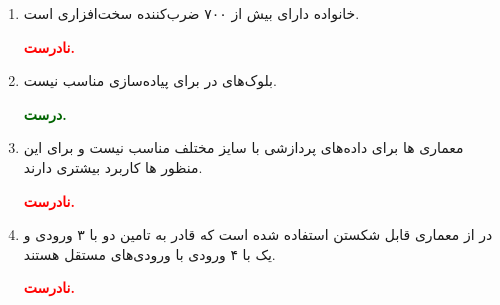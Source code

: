 \begin{enumerate}
\begin{qsolve}
	\end{qsolve}
	
	
	
	
	\item 
خانواده  دارای بیش از ۷۰۰ ضرب‌کننده سخت‌افزاری است.
	\begin{qsolve}
		\textbf{\textcolor{red}{نادرست.}}\\
	
	\end{qsolve}
	
	
	
	
	\item 
بلوک‌های  در  برای پیاده‌سازی  مناسب نیست.
	\begin{qsolve}
		\textbf{\textcolor{darkgreen}{درست.}}\\
		
	\end{qsolve}
	
	
	
	\item 
معماری ها برای داده‌های پردازشی با سایز مختلف مناسب نیست و برای این منظور ها کاربرد بیشتری دارند.

	\begin{qsolve}
		\textbf{\textcolor{red}{نادرست.}}\\

	\end{qsolve}
	
	
	\item 
	در  از معماری  قابل شکستن استفاده شده است که قادر به تامین دو  با ۳ ورودی و یک  با ۴ ورودی با ورودی‌های مستقل هستند.
	
	\begin{qsolve}
		\textbf{\textcolor{red}{نادرست.}}\\
		
	\end{qsolve}
	
	
\end{enumerate}